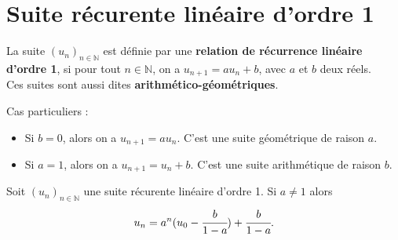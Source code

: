 \documentclass[french]{book}
\newcommand{\N}{\mathbb {N}}
\newcommand{\pa}[1]{(#1)}
\newcommand{\suite}[1][u]{\left( #1_{n} \right)_{n\in\N}}
\newcommand{\un}{\suite}
\begin{document}
\section{Suite récurente linéaire d'ordre 1}

\begin{defn}
La suite $\un$ est définie par une \textbf{relation de récurrence linéaire d'ordre 1}, si pour tout $n\in\N$, on a $u_{n+1}=au_n + b$, avec $a$ et $b$ deux réels.\\
Ces suites sont aussi dites \textbf{arithmético-géométriques}.
\end{defn}

\begin{rem}
Cas particuliers :
\begin{itemize}
	\item Si $b = 0$, alors on a $u_{n+1}=au_n$. C'est une suite géométrique de raison $a$.
	\item Si $a = 1$, alors on a $u_{n+1}=u_n+b$. C'est une suite arithmétique de raison $b$.
\end{itemize}
\end{rem}

\begin{thm}
Soit $\un$ une suite récurente linéaire d'ordre 1. Si $a\neq1$ alors  $$u_n = a^n \pa{u_0-\cfrac{b}{1-a}} + \cfrac{b}{1-a}.$$ 
\end{thm}
\end{document}
